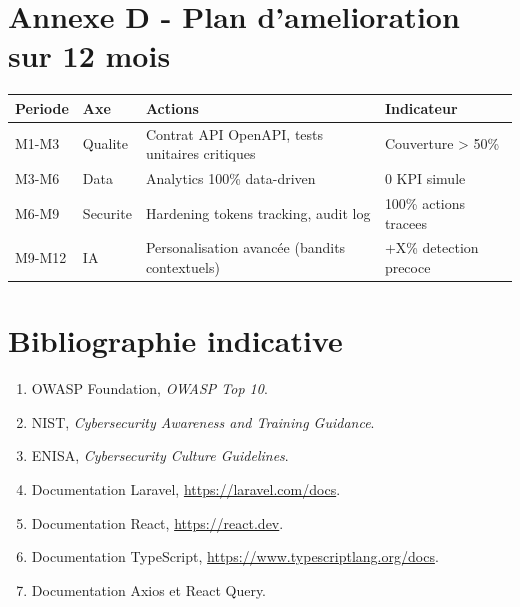 \documentclass[12pt,a4paper,oneside]{report}
\begin{document}
\chapter{Annexe D - Plan d'amelioration sur 12 mois}
\begin{longtable}{p{2.5cm} p{4.5cm} p{5.5cm} p{2.5cm}}
\toprule
\textbf{Periode} & \textbf{Axe} & \textbf{Actions} & \textbf{Indicateur} \\
\midrule
\endhead
M1-M3 & Qualite & Contrat API OpenAPI, tests unitaires critiques & Couverture > 50\% \\
M3-M6 & Data & Analytics 100\% data-driven & 0 KPI simule \\
M6-M9 & Securite & Hardening tokens tracking, audit log & 100\% actions tracees \\
M9-M12 & IA & Personalisation avancée (bandits contextuels) & +X\% detection precoce \\
\bottomrule
\end{longtable}

\chapter*{Bibliographie indicative}
\begin{enumerate}[leftmargin=1.2cm]
  \item OWASP Foundation, \textit{OWASP Top 10}.
  \item NIST, \textit{Cybersecurity Awareness and Training Guidance}.
  \item ENISA, \textit{Cybersecurity Culture Guidelines}.
  \item Documentation Laravel, \url{https://laravel.com/docs}.
  \item Documentation React, \url{https://react.dev}.
  \item Documentation TypeScript, \url{https://www.typescriptlang.org/docs}.
  \item Documentation Axios et React Query.
\end{enumerate}
\end{document}
